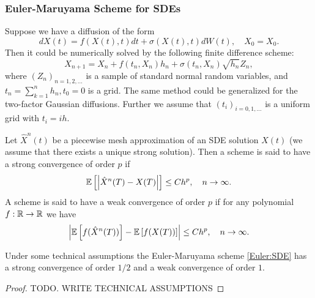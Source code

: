             \subsubsection{Euler-Maruyama Scheme for SDEs}
                Suppose we have a diffusion of the form 
                \begin{equation*}
                    dX(t) = f(X(t), t)dt + \sigma(X(t), t)dW(t), \quad X_0 = X_0.
                \end{equation*}
                Then it could be numerically solved by the following finite difference scheme:
                \begin{equation}
                    X_{n+1} = X_n + f(t_n, X_n)h_n + \sigma(t_n, X_n) \sqrt{h_n} Z_n, \label{Euler:SDE}
                \end{equation}
                where $(Z_n)_{n=1, 2, \dots}$ is a sample of standard normal random variables, and $t_n = \sum_{k=1}^n h_n, t_0 = 0$ is a grid.
                The same method could be generalized for the two-factor Gaussian diffusions. Further we assume
                that $(t_i)_{i = 0, 1, \dots}$ is a uniform grid with $t_i = ih$.

                \begin{definition}
                    Let $\hat X^n(t)$ be a piecewise mesh approximation of an SDE solution $X(t)$ (we assume that there exists a unique strong solution). 
                    Then a scheme is said to have a strong convergence of order $p$ if 
                    \begin{equation}
                        \mathbb{E}\left[\left|\hat X^n(T) - X(T)\right|\right] \leq Ch^p, \quad n \to \infty.
                    \end{equation}
                    A scheme is said to have a weak convergence of order $p$ if for any polynomial $f: \mathbb{R} \to \mathbb{R}$ we have
                    \begin{equation}
                        \left|\mathbb{E}\left[f(\hat X^n(T))\right] - \mathbb{E}\left[f(X(T))\right]\right| \leq Ch^p, \quad n \to \infty.
                    \end{equation}
                \end{definition}

                \begin{theorem}
                    Under some technical assumptions the Euler-Maruyama scheme \eqref{Euler:SDE} has a strong convergence of order $1/2$ and a weak convergence of order $1$.
                \end{theorem}
                \begin{proof}
                    {\color{red}TODO. WRITE TECHNICAL ASSUMPTIONS}
                \end{proof}
            
